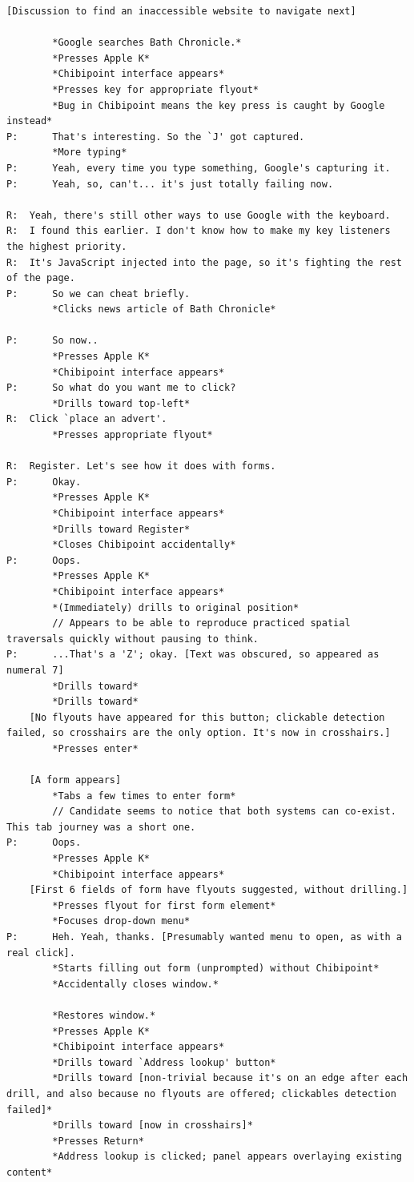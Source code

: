 \documentclass[a4paper, 12pt]{report}
\begin{document}
\begin{lstlisting}[caption={Transcript of Usability Study}, label={lst:usabilityTrans}, style=basic, language=custom, flexiblecolumns=true]
	[Discussion to find an inaccessible website to navigate next]

		*Google searches Bath Chronicle.*
		*Presses Apple K*
		*Chibipoint interface appears*
		*Presses key for appropriate flyout*
		*Bug in Chibipoint means the key press is caught by Google instead*
P:		That's interesting. So the `J' got captured.
		*More typing*
P:		Yeah, every time you type something, Google's capturing it.
P:		Yeah, so, can't... it's just totally failing now.

R:	Yeah, there's still other ways to use Google with the keyboard.
R:	I found this earlier. I don't know how to make my key listeners the highest priority.
R:	It's JavaScript injected into the page, so it's fighting the rest of the page.
P:		So we can cheat briefly.
		*Clicks news article of Bath Chronicle*

P:		So now..
		*Presses Apple K*
		*Chibipoint interface appears*
P:		So what do you want me to click?
		*Drills toward top-left*
R:	Click `place an advert'.
		*Presses appropriate flyout*

R:	Register. Let's see how it does with forms.
P:		Okay.
		*Presses Apple K*
		*Chibipoint interface appears*
		*Drills toward Register*
		*Closes Chibipoint accidentally*
P:		Oops.
		*Presses Apple K*
		*Chibipoint interface appears*
		*(Immediately) drills to original position*
		// Appears to be able to reproduce practiced spatial traversals quickly without pausing to think.
P:		...That's a 'Z'; okay. [Text was obscured, so appeared as numeral 7]
		*Drills toward*
		*Drills toward*
	[No flyouts have appeared for this button; clickable detection failed, so crosshairs are the only option. It's now in crosshairs.]
		*Presses enter*

	[A form appears]
		*Tabs a few times to enter form*
		// Candidate seems to notice that both systems can co-exist. This tab journey was a short one.
P:		Oops.
		*Presses Apple K*
		*Chibipoint interface appears*
	[First 6 fields of form have flyouts suggested, without drilling.]
		*Presses flyout for first form element*
		*Focuses drop-down menu*
P:		Heh. Yeah, thanks. [Presumably wanted menu to open, as with a real click].
		*Starts filling out form (unprompted) without Chibipoint*
		*Accidentally closes window.*

		*Restores window.*
		*Presses Apple K*
		*Chibipoint interface appears*
		*Drills toward `Address lookup' button*
		*Drills toward [non-trivial because it's on an edge after each drill, and also because no flyouts are offered; clickables detection failed]*
		*Drills toward [now in crosshairs]*
		*Presses Return*
		*Address lookup is clicked; panel appears overlaying existing content*


\end{lstlisting}
\end{document}
